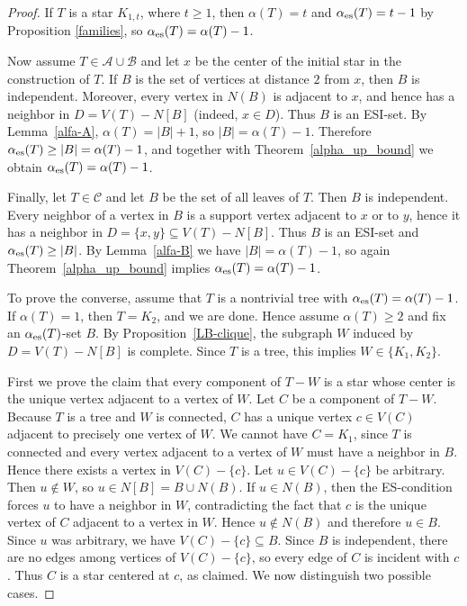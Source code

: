 \documentclass[11pt]{article}
\newcommand{\es}{\alpha_{\rm es}}
\newcommand{\al}{\alpha}
\begin{document}
\begin{proof}
If $T$ is a star $K_{1,t}$, where $t\ge 1$, then $\al(T)=t$ and $\es(T)=t-1$ by Proposition \ref{families}, so $\es(T)=\al(T)-1$.

Now assume $T\in\mathcal{A}\cup\mathcal{B}$ and let $x$ be the center of the initial star in the construction of $T$. If $B$ is the set of vertices at distance $2$ from $x$, then $B$ is independent. Moreover, every vertex in $N(B)$ is adjacent to $x$, and hence has a neighbor in
$D=V(T)-N[B]$ (indeed, $x\in D$). Thus $B$ is an ESI-set. By Lemma~\ref{alfa-A},
$\al(T)=|B|+1$, so $|B|=\al(T)-1$. Therefore $\es(T)\ge |B|=\al(T)-1$, and together with
Theorem~\ref{alpha_up_bound} we obtain $\es(T)=\al(T)-1$.

Finally, let $T\in\mathcal{C}$ and let $B$ be the set of all leaves of $T$. Then $B$ is independent.
Every neighbor of a vertex in $B$ is a support vertex adjacent to $x$ or to $y$, hence it has a
neighbor in $D=\{x,y\}\subseteq V(T)-N[B]$. Thus $B$ is an ESI-set and $\es(T)\ge |B|$.
By Lemma~\ref{alfa-B} we have $|B|=\al(T)-1$, so again Theorem~\ref{alpha_up_bound} implies
$\es(T)=\al(T)-1$.

\medskip

To prove the converse, assume that $T$ is a nontrivial tree with $\es(T)=\alpha(T)-1$.
If $\alpha(T)=1$, then $T= K_2$, and we are done. 
Hence assume $\alpha(T)\ge 2$ and fix an $\es(T)$-set $B$. By Proposition~\ref{LB-clique}, the subgraph $W$ induced by $D=V(T)-N[B]$ is complete.
Since $T$ is a tree, this implies  $W\in \{K_1,K_2\}$.

First we prove the claim that every component of $T-W$ is a star whose center is the unique vertex adjacent to a vertex of $W$.
Let $C$ be a component of $T-W$. Because $T$ is a tree and $W$ is connected, $C$ has a unique vertex $c\in V(C)$ adjacent to precisely one vertex of $W$. We cannot have $C=K_1$, since $T$ is connected and every vertex adjacent to a vertex of $W$ must have a neighbor in $B$.
Hence there exists a vertex in $V(C)-\{c\}$.
Let $u\in V(C)-\{c\}$ be arbitrary. Then $u\notin W$, so $u\in N[B]=B\cup N(B)$.
If $u\in N(B)$, then the ES-condition forces $u$ to have a neighbor in $W$,
contradicting the fact that $c$ is the unique vertex of $C$ adjacent to a vertex in $W$.
Hence $u\notin N(B)$ and therefore $u\in B$. Since $u$ was arbitrary, we have $V(C)-\{c\}\subseteq B$.
Since $B$ is independent, there are no edges among vertices of $V(C)-\{c\}$, so every edge of $C$ is incident with $c$.
Thus $C$ is a star centered at $c$, as claimed. We now distinguish two possible cases.


\end{proof}
\end{document}
